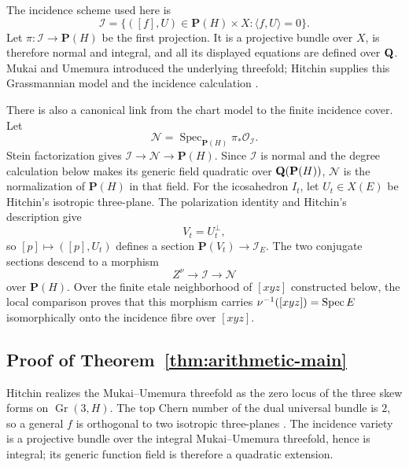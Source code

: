 The incidence scheme used here is
\[
 \mathcal I=\{([f],U)\in\mathbf P(H)\times X:
                   \langle f,U\rangle=0\}.
\]
Let \(\pi:\mathcal I\to\mathbf P(H)\) be the first projection.
It is a projective bundle over \(X\), is therefore normal and integral,
and all its displayed equations are defined over \(\mathbf Q\).  Mukai and Umemura
introduced the underlying threefold; Hitchin supplies this Grassmannian
model and the incidence calculation \cite{MukaiUmemura,HitchinBundles}.

There is also a canonical link from the chart model to the finite
incidence cover.  Let
\[
 \mathcal N=\operatorname{Spec}_{\mathbf P(H)}\pi_*\mathcal O_{\mathcal I}.
\]
Stein factorization gives
\(\mathcal I\to\mathcal N\to\mathbf P(H)\).  Since \(\mathcal I\) is normal
and the degree calculation below makes its generic field quadratic over
\(\mathbf Q(\mathbf P(H))\),
\(\mathcal N\) is the normalization of \(\mathbf P(H)\) in that field.
For the icosahedron \(I_t\), let \(U_t\in X(E)\) be Hitchin's isotropic
three-plane.  The polarization identity and Hitchin's description give
\cite[\S\S2--5]{HitchinIcosahedron}
\[
 V_t=U_t^\perp,
\]
so \([p]\mapsto([p],U_t)\) defines a section
\(\mathbf P(V_t)\to\mathcal I_E\).  The two conjugate sections descend to
a morphism
\[
 Z^\nu\longrightarrow\mathcal I\longrightarrow\mathcal N
\]
over \(\mathbf P(H)\).  Over the finite etale neighborhood of \([xyz]\)
constructed below, the local comparison proves that this morphism carries
\(\nu^{-1}([xyz])=\operatorname{Spec} E\) isomorphically onto the incidence fibre over
\([xyz]\).

\subsection{Proof of Theorem~\ref{thm:arithmetic-main}}
\label{sec:arithmetic-main-proof}

Hitchin realizes the Mukai--Umemura threefold as the zero locus of the
three skew forms on \(\operatorname{Gr}(3,H)\).  The top Chern number of
the dual universal bundle is \(2\), so a general \(f\) is orthogonal to
two isotropic three-planes \cite[\S\S4--5]{HitchinBundles}.  The incidence
variety is a projective bundle over the integral Mukai--Umemura threefold,
hence is integral; its generic function field is therefore a quadratic
extension.

